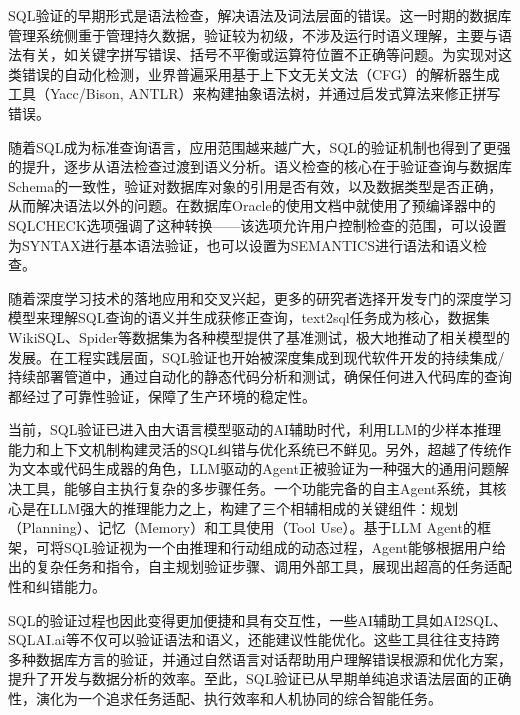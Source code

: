 \begin{CJK*}{UTF8}{song}


SQL验证的早期形式是语法检查，解决语法及词法层面的错误。这一时期的数据库管理系统侧重于管理持久数据，验证较为初级，不涉及运行时语义理解，主要与语法有关，如关键字拼写错误、括号不平衡或运算符位置不正确等问题。为实现对这类错误的自动化检测，业界普遍采用基于上下文无关文法（CFG）的解析器生成工具（Yacc/Bison, ANTLR）来构建抽象语法树，并通过启发式算法来修正拼写错误。

随着SQL成为标准查询语言，应用范围越来越广大，SQL的验证机制也得到了更强的提升，逐步从语法检查过渡到语义分析。语义检查的核心在于验证查询与数据库Schema的一致性，验证对数据库对象的引用是否有效，以及数据类型是否正确，从而解决语法以外的问题。在数据库Oracle的使用文档中就使用了预编译器中的SQLCHECK选项强调了这种转换——该选项允许用户控制检查的范围，可以设置为SYNTAX进行基本语法验证，也可以设置为SEMANTICS进行语法和语义检查。

随着深度学习技术的落地应用和交叉兴起，更多的研究者选择开发专门的深度学习模型来理解SQL查询的语义并生成获修正查询，text2sql任务成为核心，数据集WikiSQL、Spider等数据集为各种模型提供了基准测试，极大地推动了相关模型的发展。在工程实践层面，SQL验证也开始被深度集成到现代软件开发的持续集成/持续部署管道中，通过自动化的静态代码分析和测试，确保任何进入代码库的查询都经过了可靠性验证，保障了生产环境的稳定性。

当前，SQL验证已进入由大语言模型驱动的AI辅助时代，利用LLM的少样本推理能力和上下文机制构建灵活的SQL纠错与优化系统已不鲜见。另外，超越了传统作为文本或代码生成器的角色，LLM驱动的Agent正被验证为一种强大的通用问题解决工具，能够自主执行复杂的多步骤任务。一个功能完备的自主Agent系统，其核心是在LLM强大的推理能力之上，构建了三个相辅相成的关键组件：规划（Planning）、记忆（Memory）和工具使用（Tool Use）。基于LLM Agent的框架，可将SQL验证视为一个由推理和行动组成的动态过程，Agent能够根据用户给出的复杂任务和指令，自主规划验证步骤、调用外部工具，展现出超高的任务适配性和纠错能力。


SQL的验证过程也因此变得更加便捷和具有交互性，一些AI辅助工具如AI2SQL、SQLAI.ai等不仅可以验证语法和语义，还能建议性能优化。这些工具往往支持跨多种数据库方言的验证，并通过自然语言对话帮助用户理解错误根源和优化方案，提升了开发与数据分析的效率。至此，SQL验证已从早期单纯追求语法层面的正确性，演化为一个追求任务适配、执行效率和人机协同的综合智能任务。


\end{CJK*}